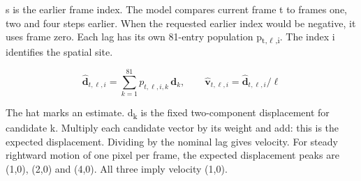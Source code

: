 \documentclass[11pt,letterpaper]{article}
\begin{document}
s is the earlier frame index. The model compares current frame t to frames one, two and four steps earlier. When the requested earlier index would be negative, it uses frame zero. Each lag has its own 81-entry population p\textsubscript{t,\(\ell\),i}. The index i identifies the spatial site.


\begin{equation}\widehat{\mathbf d}_{t,\ell,i}=\sum_{k=1}^{81}p_{t,\ell,i,k}\,\mathbf d_k,\qquad \widehat{\mathbf v}_{t,\ell,i}=\widehat{\mathbf d}_{t,\ell,i}/\ell\end{equation}

The hat marks an estimate. d\textsubscript{k} is the fixed two-component displacement for candidate k. Multiply each candidate vector by its weight and add: this is the expected displacement. Dividing by the nominal lag gives velocity. For steady rightward motion of one pixel per frame, the expected displacement peaks are (1,0), (2,0) and (4,0). All three imply velocity (1,0).
\end{document}
